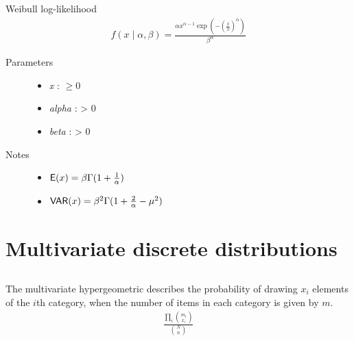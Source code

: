 \documentclass[]{jss}
\begin{document}
\subsection[Weibull]{ }


Weibull log-likelihood
\begin{eqnarray*}
    f(x \mid \alpha, \beta) = \frac{\alpha x^{\alpha - 1}
    \exp(-(\frac{x}{\beta})^{\alpha})}{\beta^\alpha}    
\end{eqnarray*}
\begin{description}
\item[Parameters] \leavevmode\begin{itemize}
\item {} 
\emph{x} : $\ge 0$

\item {} 
\emph{alpha} : \textgreater{} 0

\item {} 
\emph{beta} : \textgreater{} 0

\end{itemize}

\item[Notes]\leavevmode\begin{itemize}
\item {} 
$\mathsf{E}(x)=\beta \Gamma(1+\frac{1}{\alpha})$

\item {} 
$\mathsf{VAR}(x)=\beta^2 \Gamma(1+\frac{2}{\alpha} - \mu^2)$

\end{itemize}

\end{description}


\section{Multivariate discrete distributions} %

\subsection[multivariate hypergeometric]{ }


The multivariate hypergeometric describes the probability of drawing $x_i$
elements of the $i$th category, when the number of items in each category is
given by $m$.
\begin{eqnarray*}
\frac{\prod_i \binom{m_i}{x_i}}{\binom{N}{n}}    
\end{eqnarray*}
\end{document}

